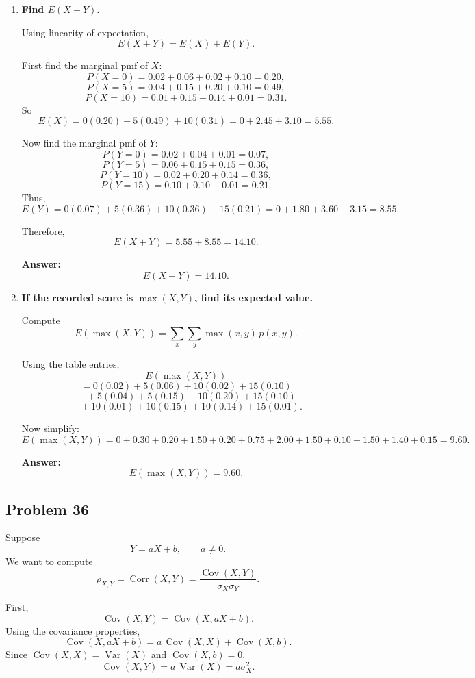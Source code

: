 \documentclass[11pt]{article}
\begin{document}
\begin{enumerate}
    \item[(a)] \textbf{Find $E(X+Y)$.}

    Using linearity of expectation,
    \[
    E(X+Y)=E(X)+E(Y).
    \]

    First find the marginal pmf of $X$:
    \[
    P(X=0)=0.02+0.06+0.02+0.10=0.20,
    \]
    \[
    P(X=5)=0.04+0.15+0.20+0.10=0.49,
    \]
    \[
    P(X=10)=0.01+0.15+0.14+0.01=0.31.
    \]
    So
    \[
    E(X)=0(0.20)+5(0.49)+10(0.31)=0+2.45+3.10=5.55.
    \]

    Now find the marginal pmf of $Y$:
    \[
    P(Y=0)=0.02+0.04+0.01=0.07,
    \]
    \[
    P(Y=5)=0.06+0.15+0.15=0.36,
    \]
    \[
    P(Y=10)=0.02+0.20+0.14=0.36,
    \]
    \[
    P(Y=15)=0.10+0.10+0.01=0.21.
    \]
    Thus,
    \[
    E(Y)=0(0.07)+5(0.36)+10(0.36)+15(0.21)
    =0+1.80+3.60+3.15=8.55.
    \]

    Therefore,
    \[
    E(X+Y)=5.55+8.55=14.10.
    \]

    \textbf{Answer:}
    \[
    E(X+Y)=14.10.
    \]

    \item[(b)] \textbf{If the recorded score is $\max(X,Y)$, find its expected value.}

    Compute
    \[
    E(\max(X,Y))=\sum_x \sum_y \max(x,y)\,p(x,y).
    \]

    Using the table entries,
    \[
    E(\max(X,Y))
    \]
    \[
    =0(0.02)+5(0.06)+10(0.02)+15(0.10)
    \]
    \[
    \quad +5(0.04)+5(0.15)+10(0.20)+15(0.10)
    \]
    \[
    \quad +10(0.01)+10(0.15)+10(0.14)+15(0.01).
    \]

    Now simplify:
    \[
    E(\max(X,Y))
    =0+0.30+0.20+1.50+0.20+0.75+2.00+1.50+0.10+1.50+1.40+0.15
    =9.60.
    \]

    \textbf{Answer:}
    \[
    E(\max(X,Y))=9.60.
    \]
\end{enumerate}

\subsection*{Problem 36}

Suppose
\[
Y=aX+b, \qquad a\ne 0.
\]
We want to compute
\[
\rho_{X,Y}=\operatorname{Corr}(X,Y)=\frac{\operatorname{Cov}(X,Y)}{\sigma_X\sigma_Y}.
\]

First,
\[
\operatorname{Cov}(X,Y)=\operatorname{Cov}(X,aX+b).
\]
Using the covariance properties,
\[
\operatorname{Cov}(X,aX+b)=a\,\operatorname{Cov}(X,X)+\operatorname{Cov}(X,b).
\]
Since $\operatorname{Cov}(X,X)=\operatorname{Var}(X)$ and $\operatorname{Cov}(X,b)=0$,
\[
\operatorname{Cov}(X,Y)=a\,\operatorname{Var}(X)=a\sigma_X^2.
\]
\end{document}
